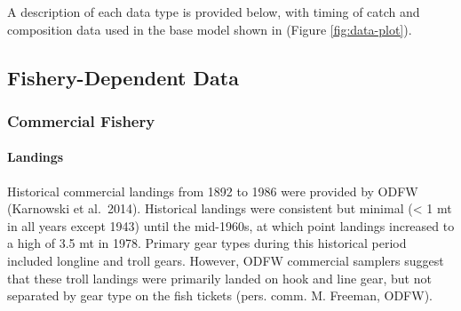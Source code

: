 \documentclass[11pt,
  english,
  a4paper,
]{article}
\begin{document}
\tagstructend


A description of each data type is provided below, with timing of catch and composition data used in the base model shown in (Figure \ref{fig:data-plot}).

\leavevmode\tagmcend\tagstructend\par


\hypertarget{fishery-dependent-data}{%
\subsection{Fishery-Dependent Data}\label{fishery-dependent-data}}

\leavevmode\tagmcend\tagstructend


\hypertarget{commercial-fishery}{%
\subsubsection{Commercial Fishery}\label{commercial-fishery}}

\leavevmode\tagmcend\tagstructend


\hypertarget{landings}{%
\paragraph{Landings}\label{landings}}

\leavevmode\tagmcend\tagstructend


Historical commercial landings from 1892 to 1986 were provided by ODFW (Karnowski et al.~2014). Historical landings were consistent but minimal (\textless{} 1 mt in all years except 1943) until the mid-1960s, at which point landings increased to a high of 3.5 mt in 1978. Primary gear types during this historical period included longline and troll gears. However, ODFW commercial samplers suggest that these troll landings were primarily landed on hook and line gear, but not separated by gear type on the fish tickets (pers. comm. M. Freeman, ODFW).

\leavevmode\tagmcend\tagstructend\par

\end{document}
